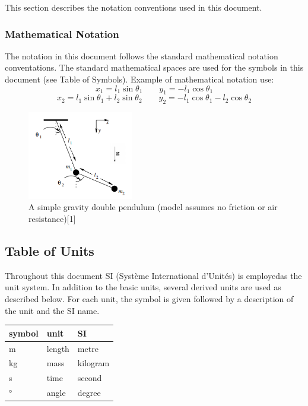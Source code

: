 \documentclass[12pt]{article}
\begin{document}
This section describes the notation conventions used in this document.

\subsubsection{Mathematical Notation}

The notation in this document follows the standard mathematical notation
conventations.
The standard mathematical spaces are used for the symbols in this document (see
Table of Symbols).
Example of mathematical notation use:
$$x_1 = l_1 \sin\theta_1 \quad\quad y_1 = -l_1 \cos\theta_1$$
$$x_2 = l_1 \sin\theta_1 + l_2 \sin\theta_2 \quad\quad y_2 = -l_1\cos\theta_1
-l_2\cos\theta_2$$

\begin{figure}[H]
	\centering
	\includegraphics[width=175px]{doublepend.PNG}
\caption{A simple gravity double pendulum (model assumes no friction or air
resistance)[1]}
	\label{fig:maxresdefault}
\end{figure}

\newpage

\subsection{Table of Units}

Throughout this document SI (Syst\`{e}me International d'Unit\'{e}s) is
employedas the unit system. In addition to the basic units, several derived
units are
used as described below.  For each unit, the symbol is given followed by a
description of the unit and the SI name.\\

\renewcommand{\arraystretch}{1.2}
\begin{center}
  \noindent \begin{tabular}{l l l} 
    \toprule		
    \textbf{symbol} & \textbf{unit} & \textbf{SI}\\
    \midrule 
    \si{\metre} & length & metre\\
    \si{\kilogram} & mass & kilogram\\
    \si{\second} & time & second\\
    \si{\degree} & angle & degree\\
    \bottomrule
  \end{tabular}
\end{center}
\end{document}
